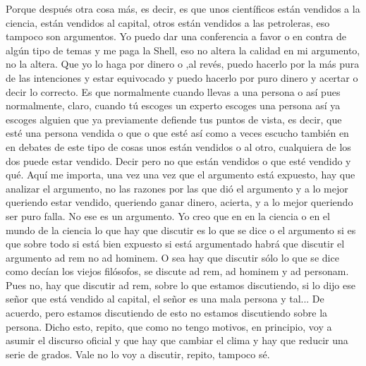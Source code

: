 Porque después otra cosa más, es decir, es que unos científicos están vendidos a la ciencia, están vendidos al capital, otros están vendidos a las petroleras, eso tampoco son argumentos. Yo puedo dar una conferencia a favor o en contra de algún tipo de temas y me paga la Shell, eso no altera la calidad en mi argumento, no la altera. Que yo lo haga por dinero o ,al revés, puedo hacerlo por la más pura de las intenciones y estar equivocado y puedo hacerlo por puro dinero y acertar o decir lo correcto. Es que normalmente cuando llevas a una persona o así pues normalmente, claro, cuando tú escoges un experto escoges una persona así ya escoges alguien que ya previamente defiende tus puntos de vista, es decir, que esté una persona vendida o que o que esté así como a veces escucho también en en debates de este tipo de cosas unos están vendidos o al otro, cualquiera de los dos puede estar vendido. Decir pero no que están vendidos o que esté vendido y qué. Aquí me importa, una vez una vez que el argumento está expuesto, hay que analizar el argumento, no las razones por las que dió el argumento y a lo mejor queriendo estar vendido, queriendo ganar dinero, acierta, y a lo mejor queriendo ser puro falla. No ese es un argumento. Yo creo que en en la ciencia o en el mundo de la ciencia lo que hay que discutir es lo que se dice o el argumento si es que sobre todo si está bien expuesto si está argumentado habrá que discutir el argumento ad rem no ad hominem. O sea hay que discutir sólo lo que se dice como decían los viejos filósofos, se discute ad rem, ad hominem y ad personam. Pues no, hay que discutir ad rem, sobre lo que estamos discutiendo, si lo dijo ese señor que está vendido al capital, el señor es una mala persona y tal... De acuerdo, pero estamos discutiendo de esto no estamos discutiendo sobre la persona. Dicho esto, repito, que como no tengo motivos, en principio, voy a asumir el discurso oficial y que hay que cambiar el clima y hay que reducir una serie de grados. Vale no lo voy a discutir, repito, tampoco sé.

